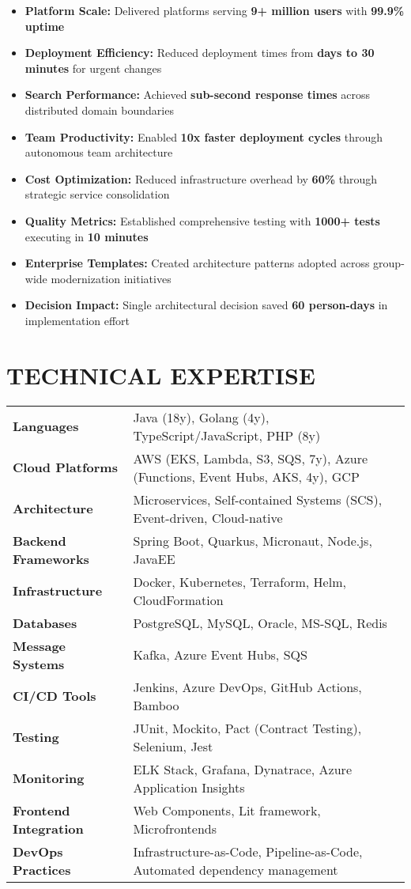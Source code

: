 \documentclass[11pt,a4paper]{article}
\renewcommand{\arraystretch}{1.2}
\begin{document}
\begin{itemize}
\item \textbf{Platform Scale:} Delivered platforms serving \textbf{9+ million users} with \textbf{99.9\% uptime}
\item \textbf{Deployment Efficiency:} Reduced deployment times from \textbf{days to 30 minutes} for urgent changes
\item \textbf{Search Performance:} Achieved \textbf{sub-second response times} across distributed domain boundaries
\item \textbf{Team Productivity:} Enabled \textbf{10x faster deployment cycles} through autonomous team architecture
\item \textbf{Cost Optimization:} Reduced infrastructure overhead by \textbf{60\%} through strategic service consolidation
\item \textbf{Quality Metrics:} Established comprehensive testing with \textbf{1000+ tests} executing in \textbf{10 minutes}
\item \textbf{Enterprise Templates:} Created architecture patterns adopted across group-wide modernization initiatives
\item \textbf{Decision Impact:} Single architectural decision saved \textbf{60 person-days} in implementation effort
\end{itemize}

\section{TECHNICAL EXPERTISE}

\renewcommand{\arraystretch}{1.1}
\begin{tabularx}{\textwidth}{@{}p{3.5cm}X@{}}
\textbf{Languages} & Java (18y), Golang (4y), TypeScript/JavaScript, PHP (8y) \\
\textbf{Cloud Platforms} & AWS (EKS, Lambda, S3, SQS, 7y), Azure (Functions, Event Hubs, AKS, 4y), GCP \\
\textbf{Architecture} & Microservices, Self-contained Systems (SCS), Event-driven, Cloud-native \\
\textbf{Backend Frameworks} & Spring Boot, Quarkus, Micronaut, Node.js, JavaEE \\
\textbf{Infrastructure} & Docker, Kubernetes, Terraform, Helm, CloudFormation \\
\textbf{Databases} & PostgreSQL, MySQL, Oracle, MS-SQL, Redis \\
\textbf{Message Systems} & Kafka, Azure Event Hubs, SQS \\
\textbf{CI/CD Tools} & Jenkins, Azure DevOps, GitHub Actions, Bamboo \\
\textbf{Testing} & JUnit, Mockito, Pact (Contract Testing), Selenium, Jest \\
\textbf{Monitoring} & ELK Stack, Grafana, Dynatrace, Azure Application Insights \\
\textbf{Frontend Integration} & Web Components, Lit framework, Microfrontends \\
\textbf{DevOps Practices} & Infrastructure-as-Code, Pipeline-as-Code, Automated dependency management \\
\end{tabularx}
\end{document}
